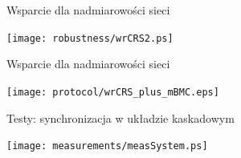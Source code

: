 \documentclass[compress,red]{beamer}
\begin{document}
\begin{frame}{Wsparcie dla nadmiarowości sieci}


  \begin{center}
  \texttt{[image: robustness/wrCRS2.ps]}
  \end{center}

\end{frame}
\begin{frame}{Wsparcie dla nadmiarowości sieci}


  \begin{center}
  \texttt{[image: protocol/wrCRS\_plus\_mBMC.eps]}
  \end{center}

\end{frame}
\begin{frame}{Testy: synchronizacja w układzie kaskadowym}

    \begin{center}
    \texttt{[image: measurements/measSystem.ps]}
    \end{center}

\end{frame}
\end{document}
